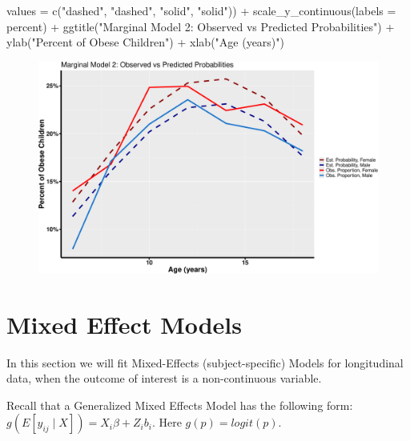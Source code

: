 \documentclass[
  letterpaper,
  DIV=11,
  numbers=noendperiod]{scrreprt}
\newenvironment{Shaded}{\begin{snugshade}}{\end{snugshade}}
\newcommand{\AttributeTok}[1]{\textcolor[rgb]{0.40,0.45,0.13}{#1}}
\newcommand{\FunctionTok}[1]{\textcolor[rgb]{0.28,0.35,0.67}{#1}}
\newcommand{\NormalTok}[1]{\textcolor[rgb]{0.00,0.23,0.31}{#1}}
\newcommand{\SpecialCharTok}[1]{\textcolor[rgb]{0.37,0.37,0.37}{#1}}
\newcommand{\StringTok}[1]{\textcolor[rgb]{0.13,0.47,0.30}{#1}}
\begin{document}
\begin{Shaded}
\begin{Highlighting}[]
    \AttributeTok{values =} \FunctionTok{c}\NormalTok{(}\StringTok{"dashed"}\NormalTok{, }\StringTok{"dashed"}\NormalTok{, }\StringTok{"solid"}\NormalTok{, }\StringTok{"solid"}\NormalTok{)) }\SpecialCharTok{+} \FunctionTok{scale\_y\_continuous}\NormalTok{(}\AttributeTok{labels =}\NormalTok{ percent) }\SpecialCharTok{+}
    \FunctionTok{ggtitle}\NormalTok{(}\StringTok{"Marginal Model 2: Observed vs Predicted Probabilities"}\NormalTok{) }\SpecialCharTok{+} \FunctionTok{ylab}\NormalTok{(}\StringTok{"Percent of Obese Children"}\NormalTok{) }\SpecialCharTok{+}
    \FunctionTok{xlab}\NormalTok{(}\StringTok{"Age (years)"}\NormalTok{)}
\end{Highlighting}
\end{Shaded}

\begin{figure}[H]

{\centering \includegraphics{Longi_noncontinuous_files/figure-pdf/unnamed-chunk-17-1.pdf}

}

\end{figure}

\hypertarget{mixed-effect-models}{%
\section{Mixed Effect Models}\label{mixed-effect-models}}

In this section we will fit Mixed-Effects (subject-specific) Models for
longitudinal data, when the outcome of interest is a non-continuous
variable.

Recall that a Generalized Mixed Effects Model has the following form:
\(g(E[y_{ij} \mid X] )= X_{i}\beta + Z_{i}b_i\). Here
\(g(p) = logit(p)\).
\end{document}
